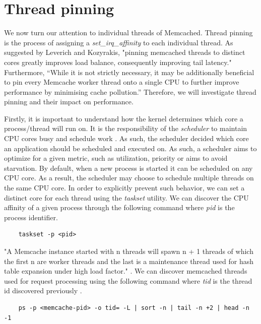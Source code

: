 
\section{Thread pinning}
\label{sec:thread-pinning}
We now turn our attention to individual threads of Memcached. Thread pinning is the process of assigning a \textit{set\_irq\_affinity} to each individual thread. As suggested by Leverich and Kozyrakis, "pinning memcached threads to distinct cores greatly improves load balance, consequently improving tail latency." \cite{leverich2014reconciling} Furthermore, ``While it is not strictly necessary, it may be additionally beneficial to pin every Memcache worker thread onto a single CPU to further improve performance by minimising cache pollution.'' \cite{solarflarememcached} Therefore, we will investigate thread pinning and their impact on performance.

Firstly, it is important to understand how the kernel determines which core a process/thread will run on. It is the responsibility of the \textit{scheduler} to maintain CPU cores busy and schedule work \cite{siddha2005chip}. As such, the scheduler decided which core an application should be scheduled and executed on. As such, a scheduler aims to optimize for a given metric, such as utilization, priority or aims to avoid starvation. By default, when a new process is started it can be scheduled on any CPU core. As a result, the scheduler may choose to schedule multiple threads on the same CPU core. In order to explicitly prevent such behavior, we can set a distinct core for each thread using the \textit{taskset} utility. We can discover the CPU affinity of a given process through the following command where \textit{pid} is the process identifier.

\begin{lstlisting}
    taskset -p <pid>
\end{lstlisting}


"A Memcache instance started with n threads will spawn n + 1 threads of which the first n are worker threads and the last is a maintenance thread used for hash table expansion under high load factor." \cite{solarflarememcached}. We can discover memcached threads used for request processing using the following command where \textit{tid} is the thread id discovered previously \cite{solarflarememcached}.
\begin{lstlisting}
    ps -p <memcache-pid> -o tid= -L | sort -n | tail -n +2 | head -n -1
\end{lstlisting}

